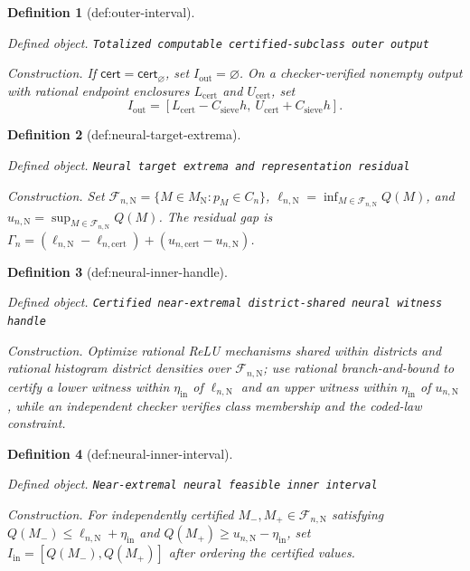 \documentclass{article}
\newtheorem{definition}{Definition}
\begin{document}
\begin{definition}[def:outer-interval]\label{def:outer-interval}
\par\smallskip\noindent\emph{Defined object.} \texttt{Totalized computable certified-\allowbreak{}subclass outer output}
\par\smallskip\noindent\emph{Construction.} If \(\mathsf{cert}=\mathsf{cert}_{\varnothing}\), set \(I_{\mathrm{out}}=\varnothing\).  On a checker-verified nonempty output with rational endpoint enclosures \(L_{\mathrm{cert}}\) and \(U_{\mathrm{cert}}\), set
\[
I_{\mathrm{out}}=[L_{\mathrm{cert}}-C_{\mathrm{sieve}}h,\ U_{\mathrm{cert}}+C_{\mathrm{sieve}}h].
\]
\end{definition}

\begin{definition}[def:neural-target-extrema]\label{def:neural-target-extrema}
\par\smallskip\noindent\emph{Defined object.} \texttt{Neural target extrema and representation residual}
\par\smallskip\noindent\emph{Construction.} Set \(\mathcal F_{n,\mathrm N}=\{M\in M_{\mathrm N}:p_M\in C_n\}\), \(\ell_{n,\mathrm N}=\inf_{M\in\mathcal F_{n,\mathrm N}}Q(M)\), and \(u_{n,\mathrm N}=\sup_{M\in\mathcal F_{n,\mathrm N}}Q(M)\). The residual gap is \(\Gamma_n=(\ell_{n,\mathrm N}-\ell_{n,\mathrm{cert}})+(u_{n,\mathrm{cert}}-u_{n,\mathrm N})\).
\end{definition}

\begin{definition}[def:neural-inner-handle]\label{def:neural-inner-handle}
\par\smallskip\noindent\emph{Defined object.} \texttt{Certified near-\allowbreak{}extremal district-\allowbreak{}shared neural witness handle}
\par\smallskip\noindent\emph{Construction.} Optimize rational ReLU mechanisms shared within districts and rational histogram district densities over \(\mathcal F_{n,\mathrm N}\); use rational branch-and-bound to certify a lower witness within \(\eta_{\mathrm{in}}\) of \(\ell_{n,\mathrm N}\) and an upper witness within \(\eta_{\mathrm{in}}\) of \(u_{n,\mathrm N}\), while an independent checker verifies class membership and the coded-law constraint.
\end{definition}

\begin{definition}[def:neural-inner-interval]\label{def:neural-inner-interval}
\par\smallskip\noindent\emph{Defined object.} \texttt{Near-\allowbreak{}extremal neural feasible inner interval}
\par\smallskip\noindent\emph{Construction.} For independently certified \(M_-,M_+\in\mathcal F_{n,\mathrm N}\) satisfying \(Q(M_-)\le\ell_{n,\mathrm N}+\eta_{\mathrm{in}}\) and \(Q(M_+)\ge u_{n,\mathrm N}-\eta_{\mathrm{in}}\), set \(I_{\mathrm{in}}=[Q(M_-),Q(M_+)]\) after ordering the certified values.
\end{definition}
\end{document}
